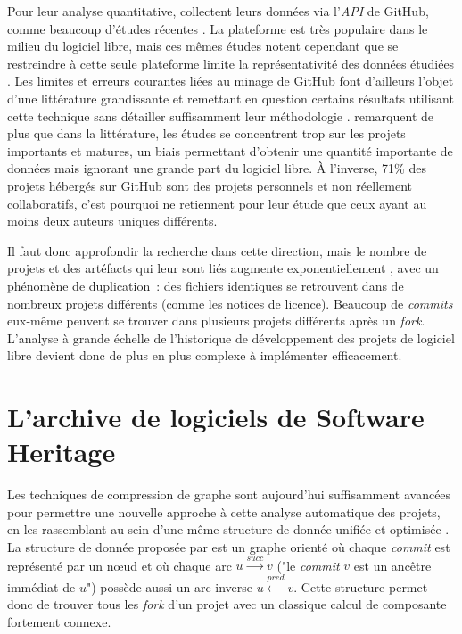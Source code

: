 \documentclass[dvipsnames,runningheads]{llncs}
\newcommand{\en}[1]{\foreignlanguage{english}{\emph{#1}}}
\begin{document}
    Pour leur analyse quantitative, \textcite{signals-2019} collectent leurs données via l'\en{API} de GitHub,
    comme beaucoup d'études récentes \parencite{github-mapping-2017}. La plateforme est très populaire dans le
    milieu du logiciel libre, mais ces mêmes études notent cependant que se restreindre à cette seule
    plateforme limite la représentativité des données étudiées \parencite{swh-growth-2019}. Les limites et
    erreurs courantes liées au minage de GitHub font d'ailleurs l'objet d'une littérature grandissante et
    remettant en question certains résultats utilisant cette technique sans détailler suffisamment leur
    méthodologie \parencite{mining-github-2014,penumbra-oss-2022}. \textcite{barriers-meta-2015} remarquent de
    plus que dans la littérature, les études se concentrent trop sur les projets importants et matures, un
    biais permettant d'obtenir une quantité importante de données mais ignorant une grande part du logiciel
    libre. À l'inverse, 71\% des projets hébergés sur GitHub sont des projets personnels et non réellement
    collaboratifs, c'est pourquoi \textcite{mining-github-2014} ne retiennent pour leur étude que ceux ayant
    au moins deux auteurs uniques différents.

    Il faut donc approfondir la recherche dans cette direction, mais le nombre de projets et des artéfacts qui
    leur sont liés augmente exponentiellement \parencite{swh-growth-2019}, avec un phénomène de duplication :
    des fichiers identiques se retrouvent dans de nombreux projets différents (comme les notices de licence).
    Beaucoup de \en{commits} eux-même peuvent se trouver dans plusieurs projets différents après un \en{fork}.
    L'analyse à grande échelle de l'historique de développement des projets de logiciel libre devient donc de
    plus en plus complexe à implémenter efficacement.

    \section{L'archive de logiciels de Software Heritage}

    \label{ssec:swh-graph}

    Les techniques de compression de graphe sont aujourd'hui suffisamment avancées pour permettre une nouvelle
    approche à cette analyse automatique des projets, en les rassemblant au sein d'une même structure de
    donnée unifiée et optimisée \parencite{swh-graph-2020}. La structure de donnée proposée par
    \textcite{swh-graph-2020} est un graphe orienté où chaque \en{commit} est représenté par un nœud et où
    chaque arc $u \xrightarrow{succ} v$ ("le \en{commit} $v$ est un ancêtre immédiat de $u$") possède aussi un
    arc inverse $u \xleftarrow{pred} v$. Cette structure permet donc de trouver tous les \en{fork} d'un
    projet avec un classique calcul de composante fortement connexe.
\end{document}
